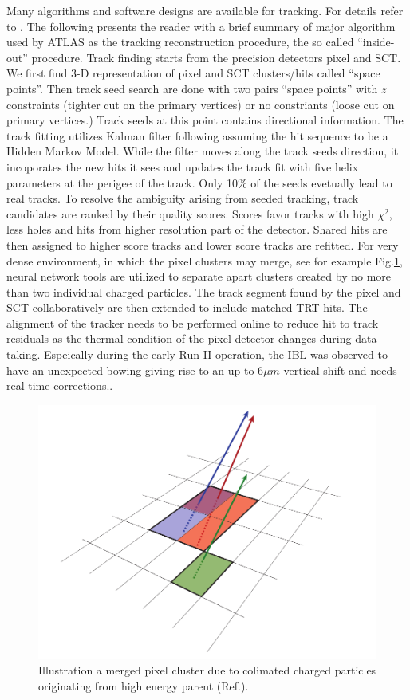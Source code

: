 \label{sec:reco-tracking}
Many algorithms and software designs are available for tracking. For details refer to \cite{newt}. The following presents the reader with a brief summary of major algorithm used by ATLAS as the tracking reconstruction procedure, the so called ``inside-out'' procedure. Track finding starts from the precision detectors pixel and SCT. We first find 3-D representation of pixel and SCT clusters/hits called ``space points''. Then track seed search are done with two pairs ``space points'' with $z$ constraints (tighter cut on the primary vertices) or no constriants (loose cut on primary vertices.) Track seeds at this point contains directional information. The track fitting utilizes Kalman filter following assuming the hit sequence to be a Hidden Markov Model. While the filter moves along the track seeds direction, it incoporates the new hits it sees and updates the track fit with five helix parameters at the perigee of the track. Only 10\% of the seeds evetually lead to real tracks. To resolve the ambiguity arising from seeded tracking, track candidates are ranked by their quality scores. Scores favor tracks with high $\chi^2$, less holes and hits from higher resolution part of the detector. Shared hits are then assigned to higher score tracks and lower score tracks are refitted. For very dense environment, in which the pixel clusters may merge, see for example Fig.\ref{fig:reco-trackingcluster}, neural network tools are utilized to separate apart clusters created by no more than two individual charged particles\cite{PERF-2012-05,PERF-2015-08}. The track segment found by the pixel and SCT collaboratively are then extended to include matched TRT hits. The alignment of the tracker needs to be performed online to reduce hit to track residuals as the thermal condition of the pixel detector changes during data taking. Espeically during the early Run II operation, the IBL was observed to have an unexpected bowing giving rise to an up to 6$\mu m$ vertical shift and needs real time corrections.\cite{tracking-align}.

\begin{figure}[htpb!]
\begin{center}
  \includegraphics[width=0.55\linewidth]{figures/Reco/TrackingClusterB}
  \caption{ Illustration a merged pixel cluster due to colimated charged particles originating from high energy parent (Ref.\cite{PERF-2015-08}). }
\label{fig:reco-trackingcluster}
\end{center}
\end{figure}


